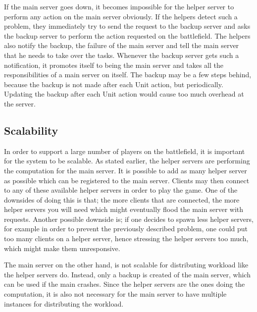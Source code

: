 If the main server goes down, it becomes impossible for the helper server to perform any action on the main server obviously.
If the helpers detect such a problem, they immediately try to send the request to the backup server and asks the backup server to perform the action requested on the battlefield.
The helpers also notify the backup, the failure of the main server and tell the main server that he needs to take over the tasks.
Whenever the backup server gets such a notification, it promotes itself to being the main server and takes all the responsibilities of a main server on itself.
The backup may be a few steps behind, because the backup is not made after each Unit action, but periodically. 
Updating the backup after each Unit action would cause too much overhead at the server.

\subsection{Scalability}
In order to support a large number of players on the battlefield, it is important for the system to be scalable.
As stated earlier, the helper servers are performing the computation for the main server.
It is possible to add as many helper server as possible which can be registered to the main server.
Clients may then connect to any of these available helper servers in order to play the game. One of the downsides of doing this is that; the more clients that are connected, the more helper servers you will need which might eventually flood the main server with requests. Another possible downside is; if one decides to spawn less helper servers, for example in order to prevent the previously described problem, one could put too many clients on a helper server, hence stressing the helper servers too much, which might make them unresponsive.

The main server on the other hand, is not scalable for distributing workload like the helper servers do. 
Instead, only a backup is created of the main server, which can be used if the main crashes.
Since the helper servers are the ones doing the computation, it is also not necessary for the main server to have multiple instances for distributing the workload.
 
